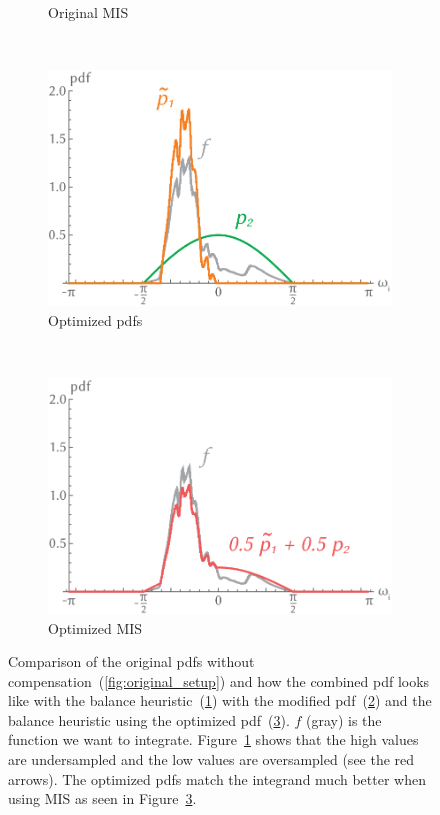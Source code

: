\begin{figure}[h]
\begin{subfigure}[b]{.3\textwidth}
        \caption{Original MIS}
        \label{fig:original_mis}
    \end{subfigure}
    \\
    \begin{subfigure}[b]{.3\textwidth}
        \centering
        \includegraphics[width=\textwidth]{images/optimized_setup.png}
        \caption{Optimized pdfs
        \label{fig:optimized_setup}}
    \end{subfigure}
    ~
    \begin{subfigure}[b]{.3\textwidth}
        \centering
        \includegraphics[width=\textwidth]{images/mis_optimized.png}
        \caption{Optimized MIS}
        \label{fig:optimized_mis}
    \end{subfigure}
    \caption{Comparison of the original pdfs without compensation~(\ref{fig:original_setup})
    and how the combined pdf looks like with the balance heuristic~(\ref{fig:original_mis})
    with the modified pdf~(\ref{fig:optimized_setup}) and the balance heuristic using the optimized pdf~(\ref{fig:optimized_mis}).
    $ f $ (gray) is the function we want to integrate.
    Figure~\ref{fig:original_mis} shows that the high values are undersampled and the low values are oversampled (see the red arrows).
    The optimized pdfs match the integrand much better when using MIS as seen in Figure~\ref{fig:optimized_mis}.
    \cite[Figure~2]{Karlik2019}}
    \label{fig:pdf_comparison}
\end{figure}

